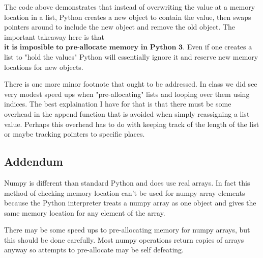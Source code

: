 \documentclass[11pt]{article}
\begin{document}
    The code above demonstrates that instead of overwriting the value at a
memory location in a list, Python creates a new object to contain the
value, then swaps pointers around to include the new object and remove
the old object. The important takeaway here is that
\(\textbf{it is imposible to pre-allocate memory in Python 3}\). Even if
one creates a list to "hold the values" Python will essentially ignore
it and reserve new memory locations for new objects.

There is one more minor footnote that ought to be addressed. In class we
did see very modest speed ups when "pre-allocating" lists and looping
over them using indices. The best explaination I have for that is that
there must be some overhead in the append function that is avoided when
simply reassigning a list value. Perhaps this overhead has to do with
keeping track of the length of the list or maybe tracking pointers to
specific places.

    \subsection{Addendum}\label{addendum}

Numpy is different than standard Python and does use real arrays. In
fact this method of checking memory location can't be used for numpy
array elements because the Python interpreter treats a numpy array as
one object and gives the same memory location for any element of the
array.

There may be some speed ups to pre-allocating memory for numpy arrays,
but this should be done carefully. Most numpy operations return copies
of arrays anyway so attempts to pre-allocate may be self defeating.


    
    
    
    
\end{document}
